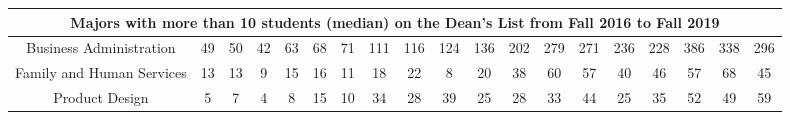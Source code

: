 \documentclass[10pt]{article}
\begin{document}
\begin{landscape}
\begin{longtable}[c]{|ccccccccccccccccccc|}
	\multicolumn{19}{|c|}{\textbf{Majors with more than 10 students (median) on the Dean's List from Fall 2016 to Fall 2019}}                                                                                                                                                                                                                                                                                                                                                                                                                                                                                                                                                       \\ \hline
	\multicolumn{1}{|c|}{Business Administration}                    & \multicolumn{1}{c|}{49}         & \multicolumn{1}{c|}{50}         & \multicolumn{1}{c|}{42}         & \multicolumn{1}{c|}{63}         & \multicolumn{1}{c|}{68}         & \multicolumn{1}{c|}{71}         & \multicolumn{1}{c|}{111}        & \multicolumn{1}{c|}{116}        & \multicolumn{1}{c|}{124}        & \multicolumn{1}{c|}{136}        & \multicolumn{1}{c|}{202}        & \multicolumn{1}{c|}{279}        & \multicolumn{1}{c|}{271}        & \multicolumn{1}{c|}{236}        & \multicolumn{1}{c|}{228}        & \multicolumn{1}{c|}{386}        & \multicolumn{1}{c|}{338}        & 296        \\ \hline
	\multicolumn{1}{|c|}{Family and Human Services}                  & \multicolumn{1}{c|}{13}         & \multicolumn{1}{c|}{13}         & \multicolumn{1}{c|}{9}          & \multicolumn{1}{c|}{15}         & \multicolumn{1}{c|}{16}         & \multicolumn{1}{c|}{11}         & \multicolumn{1}{c|}{18}         & \multicolumn{1}{c|}{22}         & \multicolumn{1}{c|}{8}          & \multicolumn{1}{c|}{20}         & \multicolumn{1}{c|}{38}         & \multicolumn{1}{c|}{60}         & \multicolumn{1}{c|}{57}         & \multicolumn{1}{c|}{40}         & \multicolumn{1}{c|}{46}         & \multicolumn{1}{c|}{57}         & \multicolumn{1}{c|}{68}         & 45         \\ \hline
	\multicolumn{1}{|c|}{Product Design}                             & \multicolumn{1}{c|}{5}          & \multicolumn{1}{c|}{7}          & \multicolumn{1}{c|}{4}          & \multicolumn{1}{c|}{8}          & \multicolumn{1}{c|}{15}         & \multicolumn{1}{c|}{10}         & \multicolumn{1}{c|}{34}         & \multicolumn{1}{c|}{28}         & \multicolumn{1}{c|}{39}         & \multicolumn{1}{c|}{25}         & \multicolumn{1}{c|}{28}         & \multicolumn{1}{c|}{33}         & \multicolumn{1}{c|}{44}         & \multicolumn{1}{c|}{25}         & \multicolumn{1}{c|}{35}         & \multicolumn{1}{c|}{52}         & \multicolumn{1}{c|}{49}         & 59         \\ \hline

\end{longtable}
\end{landscape}
\end{document}
